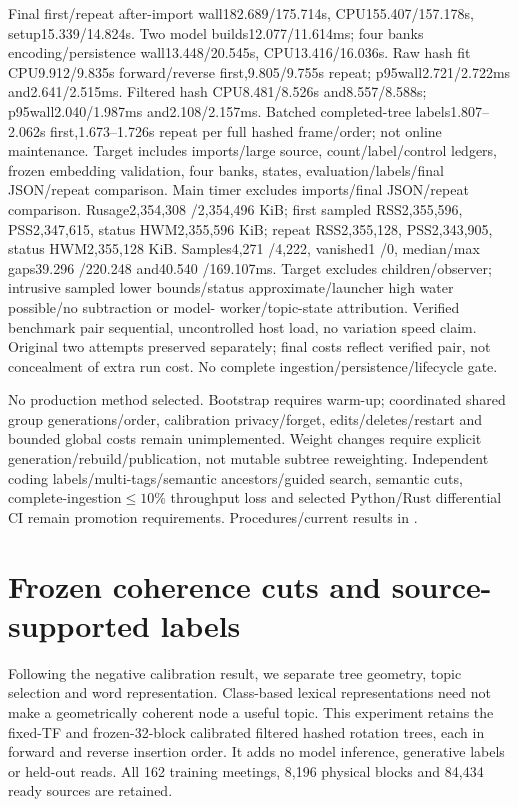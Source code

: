 \documentclass[11pt]{article}
\begin{document}
Final first/repeat after-import wall182.689/175.714s, CPU155.407/157.178s,
setup15.339/14.824s. Two model builds12.077/11.614ms; four banks encoding/persistence
wall13.448/20.545s, CPU13.416/16.036s. Raw hash fit CPU9.912/9.835s forward/reverse
first,9.805/9.755s repeat; p95wall2.721/2.722ms and2.641/2.515ms. Filtered hash
CPU8.481/8.526s and8.557/8.588s; p95wall2.040/1.987ms and2.108/2.157ms.
Batched completed-tree labels1.807--2.062s first,1.673--1.726s repeat per full
hashed frame/order; not online maintenance. Target includes imports/large source,
count/label/control ledgers, frozen embedding validation, four banks, states,
evaluation/labels/final JSON/repeat comparison. Main timer excludes imports/final
JSON/repeat comparison. Rusage2,354,308 /2,354,496 KiB; first sampled RSS2,355,596,
PSS2,347,615, status HWM2,355,596 KiB; repeat RSS2,355,128, PSS2,343,905, status
HWM2,355,128 KiB. Samples4,271 /4,222, vanished1 /0, median/max gaps39.296 /220.248
and40.540 /169.107ms. Target excludes children/observer; intrusive sampled lower
bounds/status approximate/launcher high water possible/no subtraction or model-
worker/topic-state attribution. Verified benchmark pair sequential, uncontrolled
host load, no variation speed claim. Original two attempts preserved separately;
final costs reflect verified pair, not concealment of extra run cost. No complete
ingestion/persistence/lifecycle gate.

No production method selected. Bootstrap requires warm-up; coordinated shared
group generations/order, calibration privacy/forget, edits/deletes/restart and
bounded global costs remain unimplemented. Weight changes require explicit
generation/rebuild/publication, not mutable subtree reweighting. Independent
coding labels/multi-tags/semantic ancestors/guided search, semantic cuts,
complete-ingestion$\leq10\%$ throughput loss and selected Python/Rust differential
CI remain promotion requirements. Procedures/current results in
.

\section{Frozen coherence cuts and source-supported labels}
Following the negative calibration result, we separate tree geometry, topic
selection and word representation. Class-based lexical representations
\cite{bertopic} need not make a geometrically coherent node a useful topic.
This experiment retains the fixed-TF and frozen-32-block calibrated filtered
hashed rotation trees, each in forward and reverse insertion order. It adds no
model inference, generative labels or held-out reads. All 162 training meetings,
8,196 physical blocks and 84,434 ready sources are retained.
\end{document}
